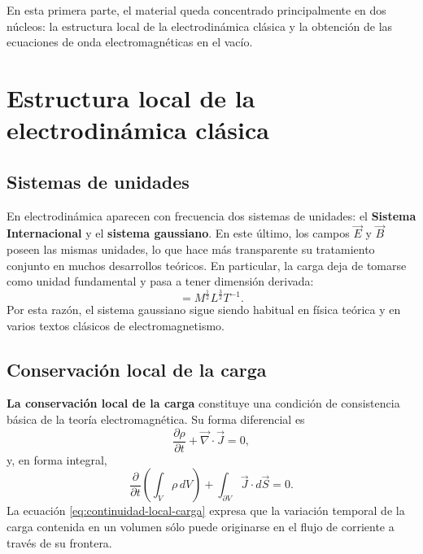 \documentclass[12pt,a4paper]{article}
\theoremstyle{definition}
\theoremstyle{plain}
\numberwithin{equation}{section}
\theoremstyle{remark}
\begin{document}
En esta primera parte, el material queda concentrado principalmente en dos núcleos: la estructura local de la electrodinámica clásica y la obtención de las ecuaciones de onda electromagnéticas en el vacío.

\newpage

\section{Estructura local de la electrodinámica clásica}

\subsection{Sistemas de unidades}

En electrodinámica aparecen con frecuencia dos sistemas de unidades: el \textbf{Sistema Internacional} y el \textbf{sistema gaussiano}. En este último, los campos $\vec E$ y $\vec B$ poseen las mismas unidades, lo que hace más transparente su tratamiento conjunto en muchos desarrollos teóricos. En particular, la carga deja de tomarse como unidad fundamental y pasa a tener dimensión derivada:
\begin{equation*}
    [q]= M^{\frac{1}{2}} L^{\frac{3}{2}}T^{-1}.
\end{equation*}
Por esta razón, el sistema gaussiano sigue siendo habitual en física teórica y en varios textos clásicos de electromagnetismo.


\subsection{Conservación local de la carga}

\textbf{La conservación local de la carga} constituye una condición de consistencia básica de la teoría electromagnética. Su forma diferencial es
\begin{equation}
    \frac{\partial \rho}{\partial t}+\vec\nabla\cdot\vec J = 0,
    \label{eq:continuidad-local-carga}
\end{equation}
y, en forma integral,
\begin{equation*}
    \frac{\partial}{\partial t}\left(\int_V \rho\, dV\right)+\int_{\partial V}\vec J\cdot d\vec S=0.
\end{equation*}
La ecuación \eqref{eq:continuidad-local-carga} expresa que la variación temporal de la carga contenida en un volumen sólo puede originarse en el flujo de corriente a través de su frontera.
\end{document}
